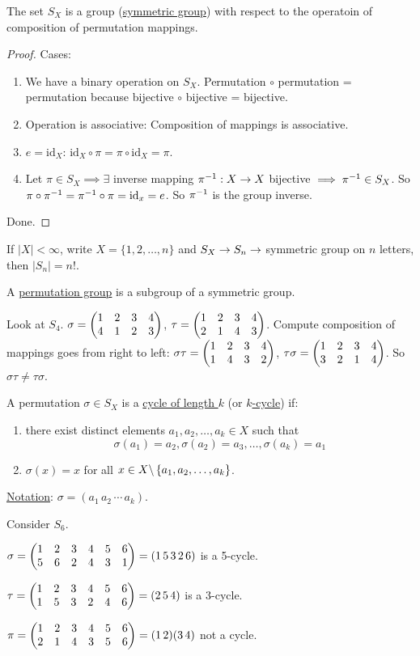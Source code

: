 \documentclass[]{article}
\begin{document}
\begin{theorem}
	The set $S_X$ is a group (\ul{symmetric group}) with respect to the operatoin of composition of permutation mappings.
\end{theorem}
\begin{proof}
	Cases:
	\begin{enumerate}
		\item We have a binary operation on $S_X$. Permutation $\circ$ permutation = permutation because bijective $\circ$ bijective = bijective.
		\item Operation is associative: Composition of mappings is associative.
		\item $e = \text{id}_X$: $\text{id}_X \circ \pi = \pi\circ \text{id}_X = \pi$.
		\item Let $\pi\in S_X \implies \exists$ inverse mapping $\pi^{-1}: X\rightarrow X$ bijective $\implies \pi^{-1}\in S_X$. So $\pi\circ\pi^{-1} = \pi^{-1}\circ\pi = \text{id}_x = e$. So $\pi^{-1}$ is the group inverse.
	\end{enumerate}
	Done.
\end{proof}

If $|X|<\infty$, write $X = \{1,2,\dots,n\}$ and $S_X\rightarrow S_n \rightarrow$ symmetric group on $n$ letters, then $|S_n| = n!$.

\begin{definition}
	A \ul{permutation group} is a subgroup of a symmetric group.
\end{definition}
\begin{example}
	Look at $S_4$. $\sigma = \begin{pmatrix}1&2&3&4\\4&1&2&3\end{pmatrix}$, $\tau = \begin{pmatrix}1&2&3&4 \\ 2&1&4&3\end{pmatrix}$. Compute composition of mappings goes from right to left: $\sigma \tau  = \begin{pmatrix}1&2&3&4\\1&4&3&2\end{pmatrix}$, $\tau\sigma = \begin{pmatrix}1&2&3&4\\3&2&1&4\end{pmatrix}$. So $\sigma\tau \neq \tau\sigma$.
\end{example}

\begin{definition}
	A permutation $\sigma\in S_X$ is a \ul{cycle of length $k$} (or \ul{$k$-cycle}) if:
	\begin{enumerate}
		\item there exist distinct elements $a_1,a_2,\dots,a_k\in X$ such that 
			$$\sigma(a_1) = a_2, \sigma(a_2) = a_3,\dots,\sigma(a_k) = a_1$$
		\item $\sigma(x) = x$ for all $x\in X\backslash\left\{ a_1,a_2,\dots,a_k \right\}$.
	\end{enumerate}
	\ul{Notation}: $\sigma = (a_1\,a_2\,\cdots\,a_k)$.
\end{definition}
\begin{example}
	Consider $S_6$.

	$\sigma = \begin{pmatrix}1&2&3&4&5&6\\5&6&2&4&3&1\end{pmatrix} = (1\,5\,3\,2\,6)$ is a 5-cycle. 
	
	$\tau = \begin{pmatrix}1&2&3&4&5&6\\1&5&3&2&4&6\end{pmatrix} = (2\,5\,4)$ is a 3-cycle.

	$\pi = \begin{pmatrix}1&2&3&4&5&6\\2&1&4&3&5&6\end{pmatrix} = (1\,2)(3\,4)$ not a cycle.
\end{example}
\end{document}
